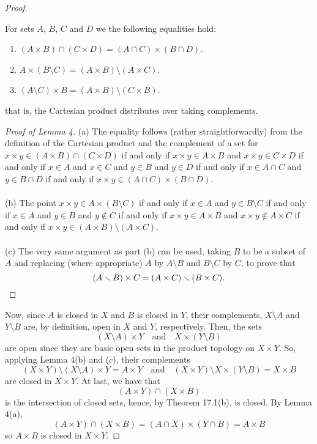 \begin{proof}
\begin{lemma}
For sets $A$, $B$, $C$ and $D$ we the following equalities hold:
\begin{enumerate}[noitemsep,label=(\alph*)]
\item $(A\times B)\cap (C\times D)=(A\cap C)\times (B\cap D)$.
\item $A\times (B\setminus C)=(A\times B)\setminus (A\times C)$.
\item $(A\setminus C)\times B=(A\times B)\setminus (C\times B)$.
\end{enumerate}
that is, the Cartesian product distributes over taking
complements.
\end{lemma}
\begin{proof}[Proof of Lemma 4]
\renewcommand\qedsymbol{$\clubsuit$}
(a) The equality follows (rather straightforwardly) from the
definition of the Cartesian product and the complement of a set
for $x\times y\in (A\times B)\cap (C\times D)$ if and only if
$x\times y\in A\times B$ and $x\times y\in C\times D$ if and only
if $x\in A$ and $x\in C$ and $y\in B$ and $y\in D$ if and only if
$x\in A\cap C$ and $y\in B\cap D$ if and only if $x\times y\in
(A\cap C)\times (B\cap D)$.
\\\\
(b) The point $x\times y\in A\times (B\setminus C)$ if and only
if $x\in A$ and $y\in B\setminus C$ if and only if $x\in A$ and
$y\in B$ and $y\notin C$ if and only if $x\times y\in A\times B$
and $x\times y\notin A\times C$ if and only if $x\times y\in
(A\times B)\setminus (A\times C)$.
\\\\
(c) The very same argument as part (b) can be used, taking $B$ to
be a subset of $A$ and replacing (where appropriate) $A$ by
$A\setminus B$ and $B\setminus C$ by $C$, to prove that
\[
(A\setminus B)\times C=(A\times C)\setminus (B\times C).\qedhere
\]
\end{proof}
Now, since $A$ is closed in $X$ and $B$ is closed in $Y$, their
complements, $X\setminus A$ and $Y\setminus B$ are, by
definition, open in $X$ and $Y$, respectively. Then, the sets
\[
(X\setminus A)\times Y
\quad
\text{and}
\quad
X\times (Y\setminus B)
\]
are open since they are basic open sets in the product topology
on $X\times Y$. So, applying Lemma 4(b) and (c), their
complements
\[
(X\times Y)\setminus (X\setminus A)\times Y=A\times Y
\quad
\text{and}
\quad
(X\times Y)\setminus X\times (Y\setminus B)=X\times B
\]
are closed in $X\times Y$. At last, we have that
\[
(A\times Y)\cap (X\times B)
\]
is the intersection of closed sets, hence, by Theorem 17.1(b), is
closed. By Lemma 4(a),
\[
(A\times Y)\cap (X\times B)=(A\cap X)\times (Y\cap B)=A\times B
\]
so $A\times B$ is closed in $X\times Y$.
\end{proof}
